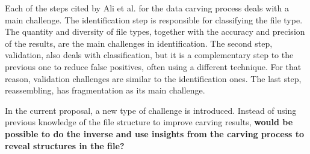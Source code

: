 Each of the steps cited by Ali et al. \cite{ali_review_2018} for the data carving process deals with a main challenge. The identification step is responsible for classifying the file type. The quantity and diversity of file types, together with the accuracy and precision of the results, are the main challenges in identification. The second step, validation, also deals with classification, but it is a complementary step to the previous one to reduce false positives, often using a different technique. For that reason, validation challenges are similar to the identification ones. The last step, reassembling, has fragmentation as its main challenge.

In the current proposal, a new type of challenge is introduced. Instead of using previous knowledge of the file structure to improve carving results, \textbf{would be possible to do the inverse and use insights from the carving process to reveal structures in the file?}





